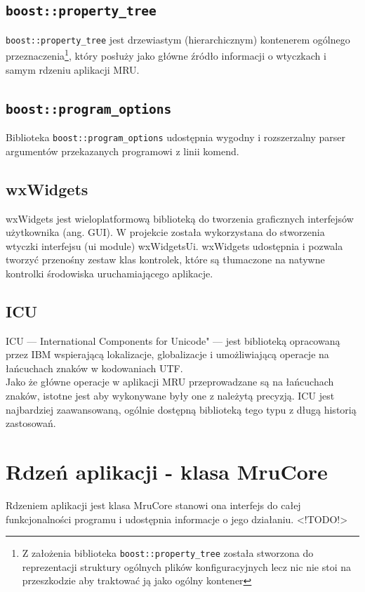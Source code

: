 \subsection{\texttt{boost::property\_tree}}
\par
\texttt{boost::property\_tree} jest drzewiastym (hierarchicznym) kontenerem ogólnego przeznaczenia\footnote{Z założenia biblioteka \texttt{boost::property\_tree} została stworzona do reprezentacji struktury ogólnych plików konfiguracyjnych lecz nic nie stoi na przeszkodzie aby traktować ją jako ogólny kontener}, który posłuży jako główne źródło informacji o wtyczkach i samym rdzeniu aplikacji MRU.

\subsection{\texttt{boost::program\_options}}
\par
Biblioteka \texttt{boost::program\_options} udostępnia wygodny i rozszerzalny parser argumentów przekazanych programowi z linii komend.

\subsection{wxWidgets}
wxWidgets jest wieloplatformową biblioteką do tworzenia graficznych interfejsów użytkownika (ang. GUI). W projekcie została wykorzystana do stworzenia wtyczki interfejsu (ui module) wxWidgetsUi. wxWidgets udostępnia i pozwala tworzyć przenośny zestaw klas kontrolek, które są tłumaczone na natywne kontrolki środowiska uruchamiającego aplikacje.

\subsection{ICU}
ICU --- International Components for Unicode" --- jest biblioteką opracowaną przez IBM wspierającą lokalizacje, globalizacje i umożliwiającą operacje na łańcuchach znaków w kodowaniach UTF.\\
Jako że główne operacje w aplikacji MRU przeprowadzane są na łańcuchach znaków, istotne jest aby wykonywane były one z należytą precyzją. ICU jest najbardziej zaawansowaną, ogólnie dostępną biblioteką tego typu z długą historią zastosowań.

\clearpage

\section{Rdzeń aplikacji - klasa MruCore}
Rdzeniem aplikacji jest klasa MruCore stanowi ona interfejs do całej funkcjonalności programu i udostępnia informacje o jego działaniu.
<!TODO!>

